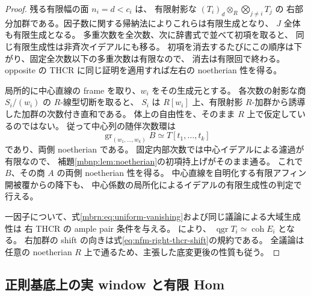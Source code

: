 \begin{proof}
残る有限幅の面 $n_i=d<c_i$ は、
有限射影な $(T_i)_d\otimes_R\bigotimes_{j\ne i}T_j$ の
右部分加群である。因子数に関する帰納法によりこれらは有限生成となり、
$J$ 全体も有限生成となる。
多重次数を全次数、次に辞書式で並べて初項を取ると、
同じ有限生成性は非斉次イデアルにも移る。
初項を消去するたびにこの順序は下がり、固定全次数以下の多重次数は有限なので、
消去は有限回で終わる。
opposite の THCR に同じ証明を適用すれば左右の noetherian 性を得る。

局所的に中心直線の frame を取り、$w_i$ をその生成元とする。
各次数の射影な商 $S_i/(w_i)$ の $R$-線型切断を取ると、
$S_i$ は $R[w_i]$ 上、有限射影 $R$-加群から誘導した加群の次数付き直和である。
体上の自由性を、そのまま $R$ 上で仮定しているのではない。
従って中心列の随伴次数環は
\[
 \operatorname{gr}_{(w_1,\ldots,w_k)}B
       \simeq T[t_1,\ldots,t_k]
\]
であり、両側 noetherian である。
固定内部次数では中心イデアルによる濾過が有限なので、
補題\ref{mbnp:lem:noetherian}の初項持上げがそのまま通る。
これで $B$、その商 $A$ の両側 noetherian 性を得る。
中心直線を自明化する有限アフィン開被覆からの降下も、
中心係数の局所化によるイデアルの有限生成性の判定で行える。

一因子について、式\eqref{mbrn:eq:uniform-vanishing}および同じ議論による大域生成性は
右 THCR の ample pair 条件を与える。
\cite[Proposition~7.2, Lemma~7.6]{NFMKeelerAmple}により、
$\operatorname{qgr}T_i\simeq\operatorname{coh}E_i$ となる。
右加群の shift の向きは式\eqref{eq:nfm-right-thcr-shift}の規約である。
全議論は任意の noetherian $R$ 上で通るため、主張した底変更後の性質も従う。
\end{proof}

\subsection{正則基底上の実 window と有限 Hom}

